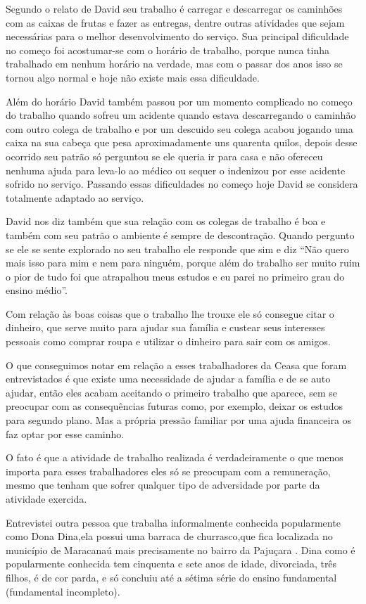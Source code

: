  Segundo o relato de David seu trabalho é carregar e descarregar os caminhões 
com as caixas de frutas e fazer as entregas, dentre outras atividades que sejam 
necessárias para o melhor desenvolvimento do serviço. Sua principal dificuldade 
no começo foi acostumar-se com o horário de trabalho, porque nunca tinha 
trabalhado em nenhum horário na verdade, mas com o passar dos anos isso se 
tornou algo normal e hoje não existe mais essa dificuldade. 

Além do horário 
David também passou por um momento complicado no começo do trabalho quando 
sofreu um acidente quando estava descarregando o caminhão com outro colega de 
trabalho e por um descuido seu colega acabou jogando uma caixa na sua cabeça que 
pesa aproximadamente uns quarenta quilos, depois desse ocorrido seu patrão só 
perguntou se ele queria ir para casa e não ofereceu nenhuma ajuda para leva-lo 
ao médico ou sequer o indenizou por esse acidente sofrido no serviço. Passando 
essas dificuldades no começo hoje David se considera totalmente adaptado ao 
serviço. 

David nos diz também que sua relação com os colegas de trabalho é boa 
e também com seu patrão o ambiente é sempre de descontração. Quando pergunto se 
ele se sente explorado no seu trabalho ele responde que sim e diz ``Não quero 
mais isso para mim e nem para ninguém, porque além do trabalho ser muito ruim o 
pior de tudo foi que atrapalhou meus estudos e eu parei no primeiro grau do 
ensino médio''. 

 Com relação às boas coisas que o trabalho lhe trouxe ele só consegue citar o 
dinheiro, que serve muito para ajudar sua família e custear seus interesses 
pessoais como comprar roupa e utilizar o dinheiro para sair com os amigos.

 O que conseguimos notar em relação a esses trabalhadores da Ceasa que foram 
entrevistados é que existe uma necessidade de ajudar a família e de se auto 
ajudar, então eles acabam aceitando o primeiro trabalho que aparece, sem se 
preocupar com as consequências futuras como, por exemplo, deixar os estudos para 
segundo plano. Mas a própria pressão familiar por uma ajuda financeira os faz 
optar por esse caminho. 

O fato é que a atividade de trabalho realizada é 
verdadeiramente o que menos importa para esses trabalhadores eles só se 
preocupam com a remuneração, mesmo que tenham que sofrer qualquer tipo de 
adversidade por parte da atividade exercida.

 Entrevistei outra pessoa que trabalha informalmente conhecida popularmente como 
Dona Dina,ela possui uma barraca de churrasco,que fica localizada no município 
de Maracanaú mais precisamente no bairro da Pajuçara . Dina como é popularmente 
conhecida tem cinquenta e sete anos de idade, divorciada, três filhos, é de cor 
parda, e só concluiu até a sétima série do ensino fundamental (fundamental 
incompleto). 

